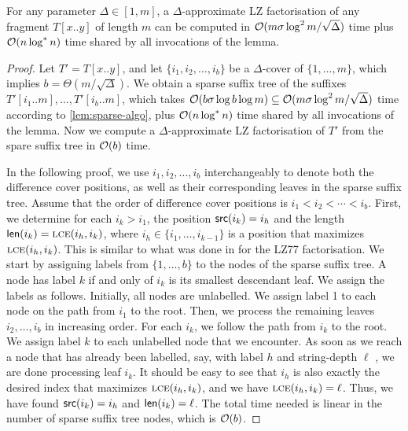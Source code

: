 \begin{lemma}
\label{lem:lz-log-star}
For any parameter $\Delta \in [1,m]$, a $\Delta$-approximate LZ factorisation of any fragment $T[x..y]$ of length $m$ can be
computed in $\mathcal{O}(m\sigma\log^2 m / \sqrt{\Delta})$ time plus $\mathcal{O}(n \log^* n)$ time shared by all invocations of the lemma.
\end{lemma}

\begin{proof}
Let $T' = T[x..y]$, and let $\{i_1, i_2, \dots,i_b\}$ be a $\Delta$-cover of $\{1, \dots, m\}$, which implies $b = \Theta(m / \sqrt{\Delta})$. We obtain a sparse suffix tree of the suffixes $T'[i_{1}..m],\ldots,T'[i_{b}..m]$, which takes $\mathcal{O}(b\sigma\log b\log m) \subseteq \mathcal{O}(m\sigma\log^2 m / \sqrt{\Delta})$ time according to \cref{lem:sparse-algo}, plus $\mathcal{O}(n \log^* n)$ time shared by all invocations of the lemma. Now we compute a $\Delta$-approximate LZ factorisation of $T'$ from the spare suffix tree in $\mathcal{O}(b)$ time.  

In the following proof, we use $i_1, i_2, \dots,i_b$ interchangeably to denote both the difference cover positions, as well as their corresponding leaves in the sparse suffix tree. 
Assume that the order of difference cover positions is $i_1 < i_2 < \cdots < i_b$. 
First, we determine for each $i_k > i_1$, the position $\textnormal{\textsf{src}}(i_k) = i_h$ and the length $\textnormal{\textsf{len}}(i_k) = \textnormal{\textsc{lce}}(i_h, i_k)$, where $i_h \in \{i_1, \dots, i_{k - 1}\}$ is a position that maximizes $\textnormal{\textsc{lce}}(i_h, i_k)$.
This is similar to what was done in \cite{Fischer2018} for the LZ77 factorisation.
We start by assigning labels from $\{1, \dots, b\}$ to the nodes of the sparse suffix tree. 
A node has label $k$ if and only of $i_k$ is its smallest descendant leaf.
We assign the labels as follows. Initially, all nodes are unlabelled. We assign label 1 to each node on the path from $i_1$ to the root.
Then, we process the remaining leaves $i_2, \dots,i_b$ in increasing order.
For each $i_k$, we follow the path from $i_k$ to the root. 
We assign label $k$ to each unlabelled node that we encounter. As soon as we reach a node that has already been labelled, say, with label $h$ and string-depth $\ell$%
, we are done processing leaf $i_k$. It should be easy to see that $i_h$ is also exactly the desired index that maximizes $\textnormal{\textsc{lce}}(i_h, i_k)$, and we have $\textnormal{\textsc{lce}}(i_h, i_k) = \ell$. Thus, we have found $\textnormal{\textsf{src}}(i_k) = i_h$ and $\textnormal{\textsf{len}}(i_k) = \ell$. 
The total time needed is linear in the number of sparse suffix tree nodes, which is $\mathcal{O}(b)$.


\end{proof}
